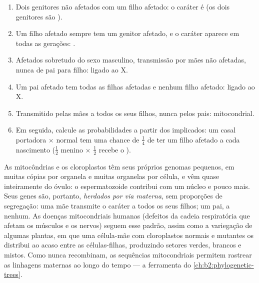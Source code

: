 \begin{method}\label{met:b2:meiosis-heredity:pedigree}
\begin{enumerate}
  \item Dois genitores não afetados com um filho afetado: o caráter é
         (os dois genitores são ).
  \item Um filho afetado sempre tem um genitor afetado, e o caráter
        aparece em todas as gerações: .
  \item Afetados sobretudo do sexo masculino, transmissão por mães não
        afetadas, nunca de pai para filho:  ligado ao X.
  \item Um pai afetado tem todas as filhas afetadas e nenhum filho
        afetado:  ligado ao X.
  \item Transmitido pelas mães a todos os seus filhos, nunca pelos
        pais: mitocondrial.
  \item Em seguida, calcule as probabilidades a partir dos 
        implicados: um casal portadora $\times$ normal tem uma chance de
        $\tfrac14$ de ter um filho afetado a cada nascimento ($\tfrac12$
        menino $\times$ $\tfrac12$ recebe o ).
\end{enumerate}
\end{method}

\begin{definition}\label{def:b2:meiosis-heredity:extranuclear}
As mitocôndrias e os cloroplastos têm seus próprios genomas pequenos,
em muitas cópias por organela e muitas organelas por célula, e vêm
quase inteiramente do óvulo: o espermatozoide contribui com um núcleo
e pouco mais. Seus genes são, portanto, \emph{herdados por via
materna}, sem proporções de segregação: uma mãe transmite o caráter a
todos os seus filhos; um pai, a nenhum. As doenças mitocondriais
humanas (defeitos da cadeia respiratória que afetam os músculos e os
nervos) seguem esse padrão, assim como a variegação de algumas
plantas, em que uma célula-mãe com cloroplastos normais e mutantes os
distribui ao acaso entre as células-filhas, produzindo setores verdes,
brancos e mistos. Como nunca recombinam, as sequências mitocondriais
permitem rastrear as linhagens maternas ao longo do tempo --- a
ferramenta do \cref{ch:b2:phylogenetic-trees}.
\end{definition}

